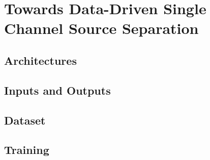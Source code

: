 \section{Towards Data-Driven Single Channel Source Separation}

\kant[1-2]
\subsection{Architectures}
\kant[1-16]
\subsection{Inputs and Outputs}
\kant[1-16]
\subsection{Dataset}
\kant[1-16]
\subsection{Training}
\kant[1-16]
